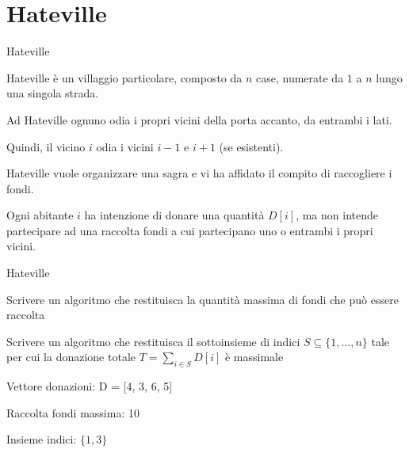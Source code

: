 \section{Hateville}

\begin{frame}{Hateville}

\BIL
\item Hateville è un villaggio particolare, composto da $n$ case, numerate da $1$ a 
$n$ lungo una singola strada. 

\item Ad Hateville ognuno odia i propri vicini della 
porta accanto, da entrambi i lati.
\item Quindi, il vicino $i$ odia i vicini $i-1$ e $i+1$ (se esistenti). 

\item Hateville vuole organizzare una sagra e vi 
ha affidato il compito di raccogliere i fondi. 

\item Ogni abitante $i$ ha intenzione
di  donare una quantità $D[i]$, ma non intende partecipare ad una raccolta 
fondi a cui partecipano uno o entrambi i propri vicini. 

\EIL

\end{frame}

\begin{frame}{Hateville}

\vspace{-9pt}
\begin{myboxtitle}[Problemi]
\BIL
\item Scrivere un algoritmo che restituisca la quantità massima di
fondi che può essere raccolta
\item Scrivere un algoritmo che restituisca il sottoinsieme di indici 
$S \subseteq \{ 1, \ldots, n \}$ tale per cui la donazione totale
$T = \sum_{i \in S} D[i]$ è massimale
\EIL
\end{myboxtitle}

\begin{myboxtitle}[Esempio]
\BIL
\item Vettore donazioni: \textsf{D = [4, 3, 6, 5]}
\item Raccolta fondi massima: 10
\item Insieme indici: $\{1, 3\}$
\EIL
\end{myboxtitle}

\end{frame}

